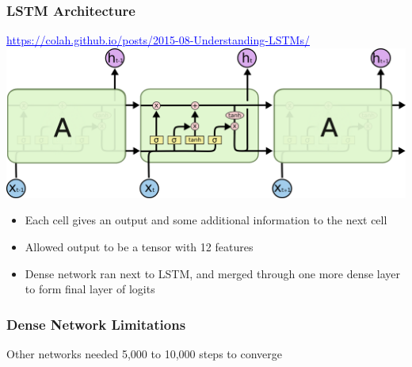 \documentclass{beamer}
\newcommand{\link}[2]{\href{#2}{\textcolor{blue}{\underline{#1}}}}
\begin{document}
\begin{frame}
  \frametitle{LSTM Architecture}

  \link{https://colah.github.io/posts/2015-08-Understanding-LSTMs/}{https://colah.github.io/posts/2015-08-Understanding-LSTMs/}
  \includegraphics[width=\linewidth]{LSTM3-chain.png}

  \begin{itemize}
  \item Each cell gives an output and some additional information to the next cell
  \item Allowed output to be a tensor with 12 features
  \item Dense network ran next to LSTM,
    and merged through one more dense layer
    to form final layer of logits
  \end{itemize}

\end{frame}

\begin{frame}
  \frametitle{Dense Network Limitations}


  Other networks needed 5,000 to 10,000 steps to converge

\end{frame}
\end{document}
